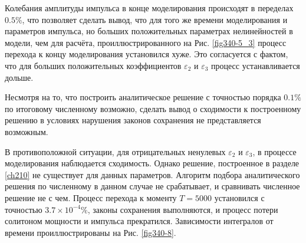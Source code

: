 \documentclass[14pt,a4paper]{extreport}
\begin{document}
			Колебания амплитуды импульса в конце моделирования происходят в переделах \(0.5\%\), что позволяет сделать вывод, что для того же времени моделирования и параметров импульса, но больших положительных параметрах нелинейностей в модели, чем для расчёта, проиллюстрированного на Рис. \ref{fig340-5_3} процесс перехода к концу моделирования установился хуже. Это согласуется с фактом, что для больших положительных коэффициентов \(\varepsilon_{2}\) и \(\varepsilon_{3}\) процесс устанавливается дольше.

			Несмотря на то, что построить аналитическое решение с точностью порядка \(0.1\%\) по итоговому численному возможно, сделать вывод о сходимости к построенному решению в условиях нарушения законов сохранения не представляется возможным.

			В противоположной ситуации, для отрицательных ненулевых \(\varepsilon_{2}\) и \(\varepsilon_{3}\), в процессе моделирования наблюдается сходимость. Однако решение, построенное в разделе \ref{ch210} не существует для данных параметров. Алгоритм подбора аналитического решения по численному в данном случае не срабатывает, и сравнивать численное решение не с чем. Процесс перехода к моменту \(T=5000\) установился с точностью \(3.7\times10^{-4}\%\), законы сохранения выполняются, и процесс потери солитоном мощности и импульса прекратился. Зависимости интегралов от времени проиллюстрированы на Рис. \ref{fig340-8}.
\end{document}
